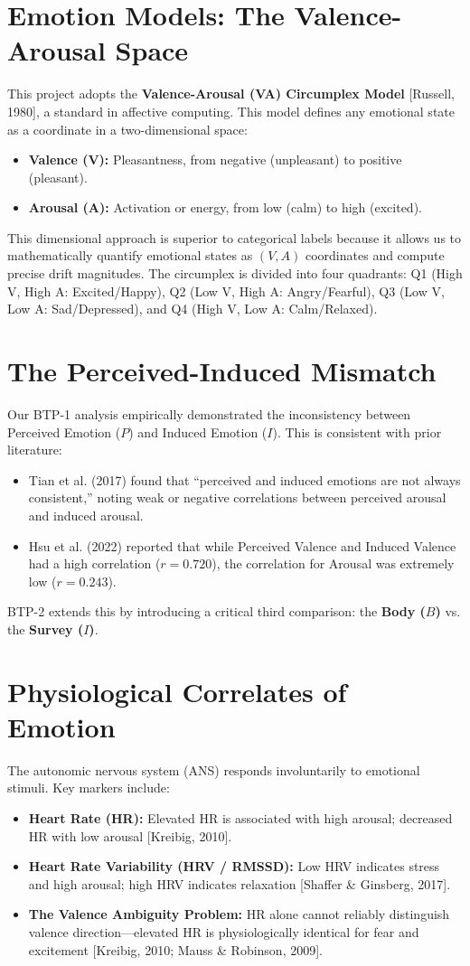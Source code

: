 \documentclass[11pt, a4paper]{report}
\begin{document}
\section{Emotion Models: The Valence-Arousal Space}
This project adopts the \textbf{Valence-Arousal (VA) Circumplex Model} [Russell, 1980], a standard in affective computing. This model defines any emotional state as a coordinate in a two-dimensional space:
\begin{itemize}
    \item \textbf{Valence (V):} Pleasantness, from negative (unpleasant) to positive (pleasant).
    \item \textbf{Arousal (A):} Activation or energy, from low (calm) to high (excited).
\end{itemize}
This dimensional approach is superior to categorical labels because it allows us to mathematically quantify emotional states as $(V, A)$ coordinates and compute precise drift magnitudes. The circumplex is divided into four quadrants: Q1 (High V, High A: Excited/Happy), Q2 (Low V, High A: Angry/Fearful), Q3 (Low V, Low A: Sad/Depressed), and Q4 (High V, Low A: Calm/Relaxed).

\section{The Perceived-Induced Mismatch}
Our BTP-1 analysis empirically demonstrated the inconsistency between Perceived Emotion ($P$) and Induced Emotion ($I$). This is consistent with prior literature:
\begin{itemize}
    \item Tian et al. (2017) found that ``perceived and induced emotions are not always consistent,'' noting weak or negative correlations between perceived arousal and induced arousal.
    \item Hsu et al. (2022) reported that while Perceived Valence and Induced Valence had a high correlation ($r = 0.720$), the correlation for Arousal was extremely low ($r = 0.243$).
\end{itemize}
BTP-2 extends this by introducing a critical third comparison: the \textbf{Body ($B$)} vs. the \textbf{Survey ($I$)}.

\section{Physiological Correlates of Emotion}
The autonomic nervous system (ANS) responds involuntarily to emotional stimuli. Key markers include:
\begin{itemize}
    \item \textbf{Heart Rate (HR):} Elevated HR is associated with high arousal; decreased HR with low arousal [Kreibig, 2010].
    \item \textbf{Heart Rate Variability (HRV / RMSSD):} Low HRV indicates stress and high arousal; high HRV indicates relaxation [Shaffer \& Ginsberg, 2017].
    \item \textbf{The Valence Ambiguity Problem:} HR alone cannot reliably distinguish valence direction---elevated HR is physiologically identical for fear and excitement [Kreibig, 2010; Mauss \& Robinson, 2009].
\end{itemize}
\end{document}
